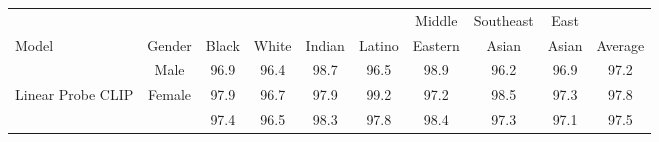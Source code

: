 \documentclass{article}
\begin{document}
\begin{table}[t]
\vskip 0.15in
\begin{center}
\begin{tabular}{lccccccccc}
\toprule
      &        &       &       &        &        & \hspace{-0.3em}Middle\hspace{-0.3em}  & \hspace{-0.3em}\hspace{-0.3em}Southeast\hspace{-0.3em}\hspace{-0.3em} & \hspace{-0.3em}East\hspace{-0.3em}  &         \\
\hspace{-0.3em}Model & \hspace{-0.3em}Gender\hspace{-0.3em} & \hspace{-0.3em}Black\hspace{-0.3em} & \hspace{-0.3em}White\hspace{-0.3em} & \hspace{-0.3em}Indian\hspace{-0.3em} & \hspace{-0.3em}Latino\hspace{-0.3em} & \hspace{-0.3em}Eastern\hspace{-0.3em} & \hspace{-0.3em}Asian\hspace{-0.3em}     & \hspace{-0.3em}Asian\hspace{-0.3em} & \hspace{-0.3em}\hspace{-0.3em}Average\hspace{-0.3em}\hspace{-0.3em} \\ \midrule
& \hspace{-0.3em}Male\hspace{-0.3em}& 96.9& 96.4& 98.7& 96.5&98.9& 96.2& 96.9& 97.2 \\
\hspace{-0.3em}Linear Probe CLIP &
\hspace{-0.3em}Female\hspace{-0.3em}& 97.9& 96.7& 97.9& 99.2& 97.2& 98.5& 97.3& 97.8\\
 & & 97.4& 96.5& 98.3& 97.8& 98.4& 97.3& 97.1& 97.5 \\

\end{tabular}
\end{center}
\end{table}
\end{document}
